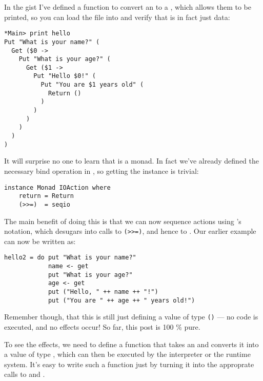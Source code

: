 \documentclass[thesis-solanki.tex]{subfiles}
\begin{document}
In the gist
 I've defined a function to convert an  to a , which allows them to be printed, so you can load the file into  
and verify that  is in fact just data:

\begin{verbatim}
*Main> print hello
Put "What is your name?" (
  Get ($0 -> 
    Put "What is your age?" (
      Get ($1 -> 
        Put "Hello $0!" (
          Put "You are $1 years old" (
            Return ()
          )
        )
      )
    )
  )
)
\end{verbatim}
It will surprise no one to learn that  is a monad. In fact we've already defined the necessary bind operation in , so getting 
the  instance is trivial:
\begin{verbatim}
instance Monad IOAction where
    return = Return
    (>>=)  = seqio
\end{verbatim}

The main benefit of doing this is that we can now sequence actions using 's
 notation, which desugars into calls to \Verb!(>>=)!, and 
hence to . Our earlier  example can now be written as:
\par
\begin{verbatim}
hello2 = do put "What is your name?"
            name <- get
            put "What is your age?"
            age <- get
            put ("Hello, " ++ name ++ "!")
            put ("You are " ++ age ++ " years old!")
\end{verbatim}
Remember though, that this is still just defining a value of type 
 \Verb!()! ---
no code is executed, and no effects occur! So far, this post is 100 \% pure.

To see the effects, we need to define a function that takes an   and converts it into a value of type  , which can then be executed by the interpreter or the runtime system. It's easy to write such a function just by turning it into the approprate calls to  and .
\end{document}
